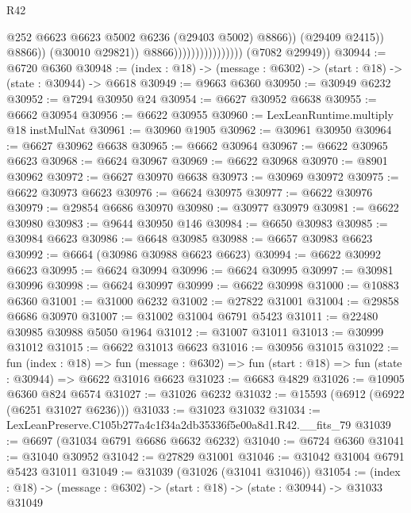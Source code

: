\begin{lexlean}{R42}
\begin{coremodule}
{                                                  @252
                                                  @6623
                                                  @6623
                                                  @5002
                                                  @6236
                                                  (@29403 @5002)
                                                  @8866))
                                              (@29409 @2415))
                                            @8866))
                                        (@30010 @29821))
                                      @8866))))))))))))))))
      (@7082 @29949))
@30944 := @6720 @6360
@30948 := (index : @18) -> (message : @6302) -> (start : @18) -> (state : @30944) -> @6618
@30949 := @9663 @6360
@30950 := @30949 @6232
@30952 := @7294 @30950 @24
@30954 := @6627 @30952 @6638
@30955 := @6662 @30954
@30956 := @6622 @30955
@30960 := LexLeanRuntime.multiply @18 instMulNat
@30961 := @30960 @1905
@30962 := @30961 @30950
@30964 := @6627 @30962 @6638
@30965 := @6662 @30964
@30967 := @6622 @30965 @6623
@30968 := @6624 @30967
@30969 := @6622 @30968
@30970 := @8901 @30962
@30972 := @6627 @30970 @6638
@30973 := @30969 @30972
@30975 := @6622 @30973 @6623
@30976 := @6624 @30975
@30977 := @6622 @30976
@30979 := @29854 @6686 @30970
@30980 := @30977 @30979
@30981 := @6622 @30980
@30983 := @9644 @30950 @146
@30984 := @6650 @30983
@30985 := @30984 @6623
@30986 := @6648 @30985
@30988 := @6657 @30983 @6623
@30992 := @6664 (@30986 @30988 @6623 @6623)
@30994 := @6622 @30992 @6623
@30995 := @6624 @30994
@30996 := @6624 @30995
@30997 := @30981 @30996
@30998 := @6624 @30997
@30999 := @6622 @30998
@31000 := @10883 @6360
@31001 := @31000 @6232
@31002 := @27822 @31001
@31004 := @29858 @6686 @30970
@31007 := @31002 @31004 @6791 @5423
@31011 := @22480 @30985 @30988 @5050 @1964
@31012 := @31007 @31011
@31013 := @30999 @31012
@31015 := @6622 @31013 @6623
@31016 := @30956 @31015
@31022 := fun (index : @18) =>
  fun (message : @6302) => fun (start : @18) => fun (state : @30944) => @6622 @31016 @6623
@31023 := @6683 @4829
@31026 := @10905 @6360 @824 @6574
@31027 := @31026 @6232
@31032 := @15593 (@6912 (@6922 (@6251 @31027 @6236)))
@31033 := @31023 @31032
@31034 := LexLeanPreserve.C105b277a4c1f34a2db35336f5e00a8d1.R42.__fits_79
@31039 := @6697 (@31034 @6791 @6686 @6632 @6232)
@31040 := @6724 @6360
@31041 := @31040 @30952
@31042 := @27829 @31001
@31046 := @31042 @31004 @6791 @5423 @31011
@31049 := @31039 (@31026 (@31041 @31046))
@31054 := (index : @18) -> (message : @6302) -> (start : @18) -> (state : @30944) -> @31033 @31049
}
\end{coremodule}
\end{lexlean}
